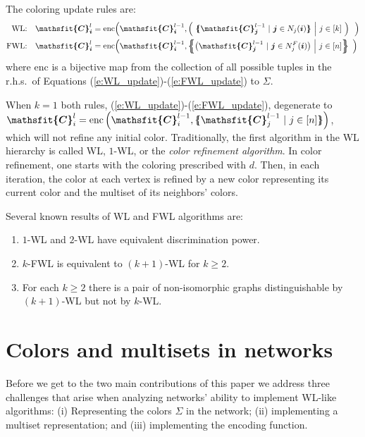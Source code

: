\documentclass{article}
\newcommand{\mset}[1]{\left\{\kern-.5em\left\{ #1 \right\}\kern-.5em\right\}}
\newcommand{\mmset}[1]{\{\kern-.4em\{ #1 \}\kern-.4em\}}
\newcommand{\parr}[1]{\left (#1\right )}
\def\plaineqref#1{\ref{#1}}
\def\vi{{\bm{i}}}
\def\vj{{\bm{j}}}
\newcommand{\tens}[1]{\bm{\mathsfit{#1}}}
\def\tC{{\tens{C}}}
\begin{document}
The coloring update rules are:
\begin{align}\label{e:WL_update}
\text{WL:} \quad \tC^l_\vi & = \mathrm{enc} \Big( \tC^{l-1}_\vi , \Big( \ \mmset{\tC^{l-1}_\vj \ \vert\  \vj\in N_j(\vi)}  \  \Big\vert \ j\in [k] \ \Big)  \ \ \Big) \\ \label{e:FWL_update}
  \text{FWL:} \quad \tC^l_\vi &= \mathrm{enc}\Big( \tC^{l-1}_\vi , \mset{ \big( \tC^{l-1}_\vj \ \vert \ \vj\in N^F_j(\vi) \big) \ \Big \vert \ j\in [n] } \ \Big)
\end{align}
where $\mathrm{enc}$ is a bijective map from the collection of all possible tuples in the r.h.s.~of  Equations (\plaineqref{e:WL_update})-(\plaineqref{e:FWL_update}) to $\Sigma$. 

When $k=1$ both rules, (\plaineqref{e:WL_update})-(\plaineqref{e:FWL_update}), degenerate to $\tC^l_i=\mathrm{enc} \parr{\tC^{l-1}_i, \mmset{\tC^{l-1}_j \ \vert \ j\in [n]}  }$, which will not refine any initial color. Traditionally, the first algorithm in the WL hierarchy is called WL, $1$-WL, or the \emph{color refinement algorithm}. In color refinement, one starts with the coloring prescribed with $d$. Then, in each iteration, the color at each vertex is refined by a new color representing its current color and the multiset of its neighbors' colors. 

Several known results of WL and FWL algorithms \citep{cai1992optimal,grohe2017descriptive,morris2018weisfeiler,grohe2015pebble} are:
\begin{enumerate}
    \item $1$-WL and $2$-WL have equivalent discrimination power. 
    \item $k$-FWL is equivalent to $(k+1)$-WL for $k\geq 2$.
    \item For each $k\geq 2$ there is a pair of non-isomorphic graphs distinguishable by $(k+1)$-WL but not by $k$-WL. \vspace{-3pt}
\end{enumerate}

\section{Colors and multisets in networks}\label{s:colors_and_multisets}
\vspace{-5pt}
Before we get to the two main contributions of this paper we address three challenges that arise when analyzing networks' ability to implement WL-like algorithms: (i) Representing the colors $\Sigma$ in the network; (ii) implementing a multiset representation; and  (iii) implementing the encoding function. 
\end{document}
